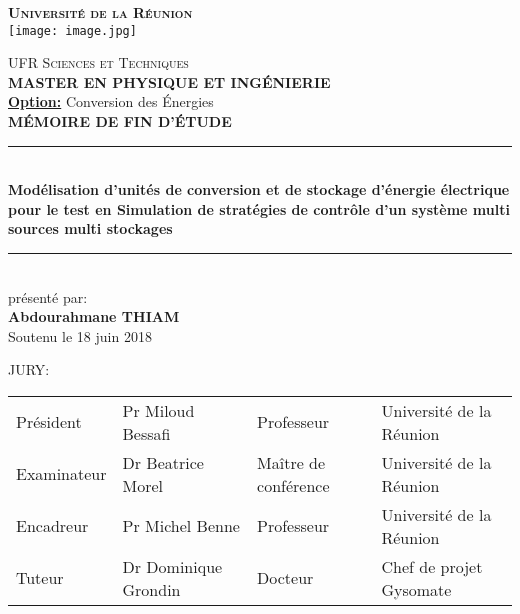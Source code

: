 \documentclass[a4paper,twoside,10
pt]{report}
\begin{document}
\thispagestyle{empty}
\begin{center}
\textsc{\textbf{\LARGE {Université de la Réunion }}} \vspace{1cm}\\
\texttt{[image: image.jpg]}\vspace{1cm}


  
 \textsc{UFR Sciences et Techniques}\vspace{1cm}\\ \Large\textbf{MASTER EN PHYSIQUE ET INGÉNIERIE}\\
 \textbf{\underline{Option:}} Conversion des Énergies\vspace{1cm}\\\textsc{\textbf{MÉMOIRE DE FIN D'ÉTUDE} }\vspace{1cm}\\
\rule{0.95\textwidth}{2pt} \\
\LARGE\textbf{Modélisation d'unités de conversion et de stockage d'énergie électrique pour le test en Simulation de stratégies de contrôle d'un système multi sources multi stockages}\\
\rule{0.95\textwidth}{2pt}\vspace{1cm}\\présenté par:\\
\textbf{Abdourahmane THIAM}\vspace{0.5cm}\\Soutenu le 18 juin  2018  
\end{center}
JURY:
\begin{center}
    \begin{tabular}{l l l l}
        Président & Pr Miloud Bessafi & Professeur &Université de la Réunion\\
        Examinateur & Dr Beatrice Morel & Maître de conférence &Université de la Réunion \\
        Encadreur &Pr Michel Benne & Professeur &Université de la Réunion\\
        Tuteur &Dr Dominique Grondin & Docteur &Chef de projet Gysomate\\
    \end{tabular}
\end{center}
\end{document}
